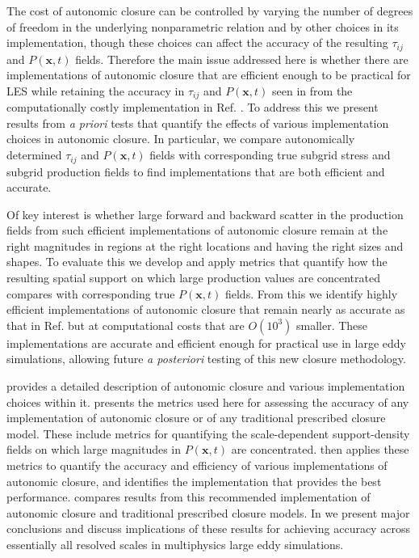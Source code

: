 The cost of autonomic closure can be controlled by varying the number of degrees of freedom in the underlying nonparametric relation and by other choices in its implementation, though these choices can affect the accuracy of the resulting   $\tau_{ij}$   and   $P(\mathbf{x},t)$  fields. Therefore the main issue addressed here is whether there are implementations of autonomic closure that are efficient enough to be practical for LES while retaining the accuracy in   $\tau_{ij}$   and   $P(\mathbf{x},t)$   seen in  from the computationally costly implementation in Ref. \cite{king2016autonomic}. To address this we present results from   \textit{a priori}   tests that quantify the effects of various implementation choices in autonomic closure. In particular, we compare autonomically determined    $\tau_{ij}$   and   $P(\mathbf{x},t)$    fields with corresponding true subgrid stress and subgrid production fields to find implementations that are both efficient and accurate.  

Of key interest is whether large forward and backward scatter in the production fields from such efficient implementations of autonomic closure remain at the right magnitudes in regions at the right locations and having the right sizes and shapes. To evaluate this we develop and apply metrics that quantify how the resulting spatial support on which large production values are concentrated compares with corresponding true  $P(\mathbf{x},t)$  fields. From this we identify highly efficient implementations of autonomic closure that remain nearly as accurate as that in Ref. \cite{king2016autonomic} but at computational costs that are $O(10^3)$ smaller. These implementations are accurate and efficient enough for practical use in large eddy simulations, allowing future \textit{a posteriori} testing of this new closure methodology. 

 provides a detailed description of autonomic closure and various implementation choices within it.  presents the metrics used here for assessing the accuracy of any implementation of autonomic closure or of any traditional prescribed closure model. These include metrics for quantifying the scale-dependent support-density fields on which large magnitudes in   $P(\mathbf{x},t)$  are concentrated.  then applies these metrics to quantify the accuracy and efficiency of various implementations of autonomic closure, and identifies the implementation that provides the best performance.  compares results from this recommended implementation of autonomic closure and traditional prescribed closure models. In  we present major conclusions and discuss implications of these results for achieving accuracy across essentially all resolved scales in multiphysics large eddy simulations. 

